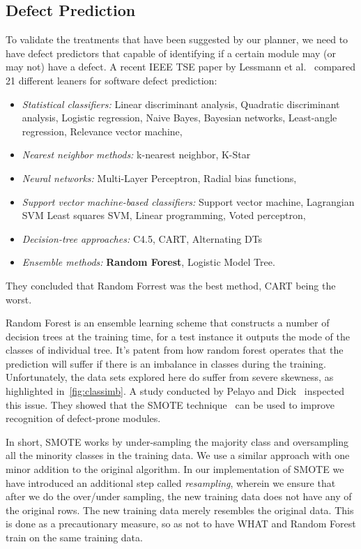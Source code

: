 \documentclass[conference]{IEEEtran}
\newcommand{\bi}{\begin{itemize}}
\newcommand{\ei}{\end{itemize}}
\begin{document}
\subsection{Defect Prediction}

To validate the treatments that have been suggested by our planner, we need to have defect predictors that capable of identifying if a certain module may (or may not) have a defect. A recent IEEE TSE paper by Lessmann et al.~\cite{lessmann} compared 21 different leaners for software defect prediction: 
\bi
\item
{\em Statistical classifiers:}
Linear    discriminant analysis,
Quadratic discriminant analysis,
Logistic regression,
Naive Bayes,
Bayesian networks,
Least-angle regression,
Relevance vector machine,

\item
{\em Nearest neighbor methods:}
k-nearest neighbor,
K-Star

\item
{\em Neural networks:}
Multi-Layer Perceptron,
Radial bias functions,

\item
{\em Support vector machine-based classifiers:}
Support vector machine,
Lagrangian SVM
Least squares SVM,
Linear programming,
Voted perceptron,

\item
{\em Decision-tree approaches:}
C4.5,
CART,
Alternating DTs
\item
{\em Ensemble methods:}
\textbf{Random Forest},
Logistic Model Tree.
\ei

They concluded that Random Forrest was the best method, CART being the worst.

Random Forest is an ensemble learning scheme that constructs a number of decision trees at the training time, for a test instance it outputs the mode of the classes of individual tree. It's patent from how random forest operates that the prediction will suffer if there is an imbalance in classes during the training. Unfortunately, the data sets explored here do suffer from severe skewness, as highlighted in~\ref{fig:classimb}. A study conducted by Pelayo and Dick~\cite{smote2} inspected this issue. They showed that the SMOTE technique~\cite{smote} can be used to improve recognition of defect-prone modules. 

In short, SMOTE works by under-sampling the majority class and oversampling all the minority classes in the training data. We use a similar approach with one minor addition to the original algorithm. In our implementation of SMOTE we have introduced an additional step called \textit{resampling}, wherein we ensure that after we do the over/under sampling, the new training data does not have any of the original rows. The new training data merely resembles the original data. This is done as a precautionary measure, so as not to have WHAT and Random Forest train on the same training data. 
\end{document}
